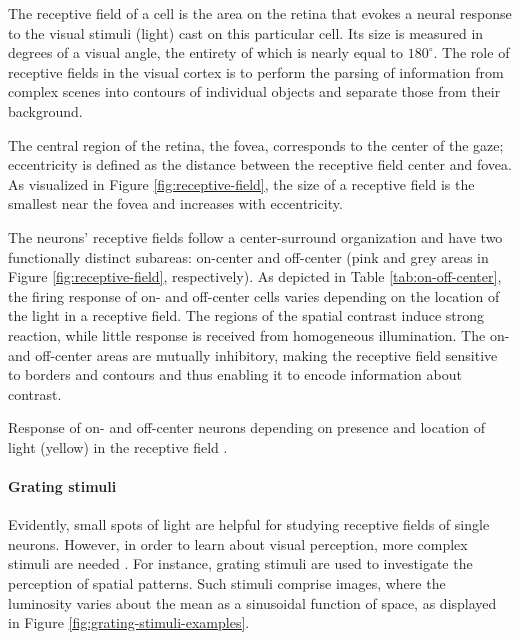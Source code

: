 The receptive field of a cell is the area on the retina that evokes a neural response to the visual stimuli (light) cast on this particular cell. Its size is measured in degrees of a visual angle, the entirety of which is nearly equal to $180^\circ$. The role of receptive fields in the visual cortex is to perform the parsing of information from complex scenes into contours of individual objects and separate those from their background.

The central region of the retina, the fovea, corresponds to the center of the gaze; eccentricity is defined as the distance between the receptive field center and fovea.
As visualized in Figure \ref{fig:receptive-field}, the size of a receptive field is the smallest near the fovea and increases with eccentricity.

The neurons' receptive fields follow a center-surround organization and have two functionally distinct subareas: on-center and off-center (pink and grey areas in Figure \ref{fig:receptive-field}, respectively). As depicted in Table \ref{tab:on-off-center}, the firing response of on- and off-center cells varies depending on the location of the light in a receptive field. The regions of the spatial contrast induce strong reaction, while little response is received from homogeneous illumination. The on- and off-center areas are mutually inhibitory, making the receptive field sensitive to borders and contours and thus enabling it to encode information about contrast.

\begin{table}[!htp]
    \centering
    
    \caption{Response of on- and off-center neurons depending on presence and location of light (yellow) in the receptive field \cite{KandelBook2003:25}.}
    \label{tab:on-off-center}
\end{table}

\paragraph{Grating stimuli}

Evidently, small spots of light are helpful for studying receptive fields of single neurons. However, in order to learn about visual perception, more complex stimuli are needed \cite{KandelBook2003:26}. For instance, grating stimuli are used to investigate the perception of spatial patterns. Such stimuli comprise images, where the luminosity varies about the mean as a sinusoidal function of space, as displayed in Figure \ref{fig:grating-stimuli-examples}. 

